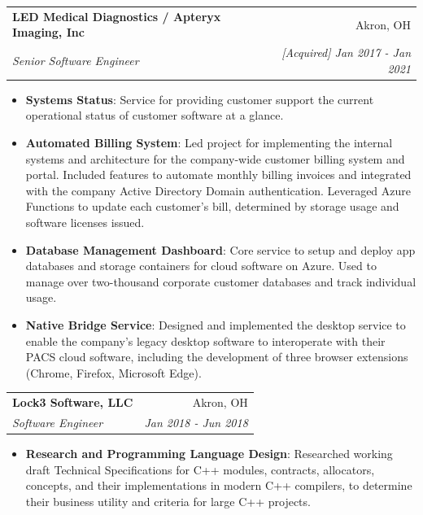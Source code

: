 \documentclass[letterpaper,11pt]{article}
\makeatletter
\newcommand{\resumeItem}[2]{
  \item\small{
    \textbf{#1}{: #2 \vspace{-2pt}}
  }
}
\newcommand{\resumeSubheading}[4]{
  \vspace{-1pt}\item
    \begin{tabular*}{0.97\textwidth}[t]{l@{\extracolsep{\fill}}r}
      \textbf{#1} & #2 \\
      \textit{\small#3} & \textit{\small #4} \\
    \end{tabular*}\vspace{-5pt}
}
\newcommand{\resumeItemListStart}{\begin{itemize}}
\newcommand{\resumeItemListEnd}{\end{itemize}\vspace{-5pt}}
\makeatother
\begin{document}
      
    \resumeSubheading
      {LED Medical Diagnostics / Apteryx Imaging, Inc}{Akron, OH}
      {Senior Software Engineer}{[Acquired] Jan 2017 - Jan 2021}
      \resumeItemListStart
        \resumeItem{Systems Status}
          {Service for providing customer support the current operational status of customer software at a glance.}
        \resumeItem{Automated Billing System}
          {Led project for implementing the internal systems and architecture for the company-wide customer billing system and portal. Included features to automate monthly billing invoices and integrated with the company Active Directory Domain authentication. Leveraged Azure Functions to update each customer's bill, determined by storage usage and software licenses issued.}
        \resumeItem{Database Management Dashboard}
          {Core service to setup and deploy app databases and storage containers for cloud software on Azure. Used to manage over two-thousand corporate customer databases and track individual usage.}
        \resumeItem{Native Bridge Service}
          {Designed and implemented the desktop service to enable the company's legacy desktop software to interoperate with their PACS cloud software, including the development of three browser extensions (Chrome, Firefox, Microsoft Edge).}
      \resumeItemListEnd
      
    \resumeSubheading
      {Lock3 Software, LLC}{Akron, OH}
      {Software Engineer}{Jan 2018 - Jun 2018}
      \resumeItemListStart
        \resumeItem{Research and Programming Language Design}
          {Researched working draft Technical Specifications for C++ modules, contracts, allocators, concepts, and their implementations in modern C++ compilers, to determine their business utility and criteria for large C++ projects.}
      \resumeItemListEnd
\end{document}
